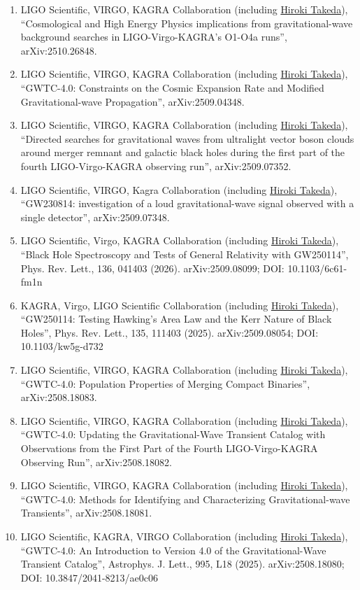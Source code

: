 \documentclass[uplatex, 11pt]{jsarticle}
\begin{document}
\begin{enumerate}
\item LIGO Scientific, VIRGO, KAGRA Collaboration (including \uline{Hiroki Takeda}), “Cosmological and High Energy Physics implications from gravitational-wave background searches in LIGO-Virgo-KAGRA's O1-O4a runs”, arXiv:2510.26848.
\item LIGO Scientific, VIRGO, KAGRA Collaboration (including \uline{Hiroki Takeda}), “GWTC-4.0: Constraints on the Cosmic Expansion Rate and Modified Gravitational-wave Propagation”, arXiv:2509.04348.
\item LIGO Scientific, VIRGO, KAGRA Collaboration (including \uline{Hiroki Takeda}), “Directed searches for gravitational waves from ultralight vector boson clouds around merger remnant and galactic black holes during the first part of the fourth LIGO-Virgo-KAGRA observing run”, arXiv:2509.07352.
\item LIGO Scientific, VIRGO, Kagra Collaboration (including \uline{Hiroki Takeda}), “GW230814: investigation of a loud gravitational-wave signal observed with a single detector”, arXiv:2509.07348.
\item LIGO Scientific, Virgo, KAGRA Collaboration (including \uline{Hiroki Takeda}), “Black Hole Spectroscopy and Tests of General Relativity with GW250114”, Phys. Rev. Lett., 136, 041403 (2026). arXiv:2509.08099; DOI: 10.1103/6c61-fm1n
\item KAGRA, Virgo, LIGO Scientific Collaboration (including \uline{Hiroki Takeda}), “GW250114: Testing Hawking's Area Law and the Kerr Nature of Black Holes”, Phys. Rev. Lett., 135, 111403 (2025). arXiv:2509.08054; DOI: 10.1103/kw5g-d732
\item LIGO Scientific, VIRGO, KAGRA Collaboration (including \uline{Hiroki Takeda}), “GWTC-4.0: Population Properties of Merging Compact Binaries”, arXiv:2508.18083.
\item LIGO Scientific, VIRGO, KAGRA Collaboration (including \uline{Hiroki Takeda}), “GWTC-4.0: Updating the Gravitational-Wave Transient Catalog with Observations from the First Part of the Fourth LIGO-Virgo-KAGRA Observing Run”, arXiv:2508.18082.
\item LIGO Scientific, VIRGO, KAGRA Collaboration (including \uline{Hiroki Takeda}), “GWTC-4.0: Methods for Identifying and Characterizing Gravitational-wave Transients”, arXiv:2508.18081.
\item LIGO Scientific, KAGRA, VIRGO Collaboration (including \uline{Hiroki Takeda}), “GWTC-4.0: An Introduction to Version 4.0 of the Gravitational-Wave Transient Catalog”, Astrophys. J. Lett., 995, L18 (2025). arXiv:2508.18080; DOI: 10.3847/2041-8213/ae0c06

\end{enumerate}
\end{document}
